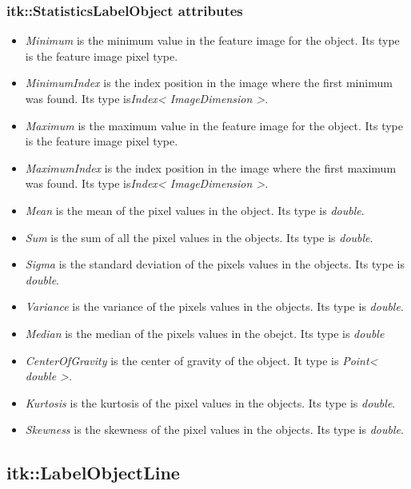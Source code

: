 \documentclass{InsightArticle}
\begin{document}
\subsubsection{itk::StatisticsLabelObject attributes}

\begin{itemize}
  \item {\em Minimum} is the minimum value in the feature image for the object. Its type is
the feature image pixel type.
  \item {\em MinimumIndex} is the index position in the image where the first minimum was
found. Its type is{\em Index< ImageDimension >}.
  \item {\em Maximum} is the maximum value in the feature image for the object. Its type is
the feature image pixel type.
  \item {\em MaximumIndex} is the index position in the image where the first maximum was
found. Its type is{\em Index< ImageDimension >}.
  \item {\em Mean} is the mean of the pixel values in the object. Its type is {\em double}.
  \item {\em Sum} is the sum of all the pixel values in the objects. Its type is {\em double}.
  \item {\em Sigma} is the standard deviation of the pixels values in the objects. Its type
is {\em double}.
  \item {\em Variance} is the variance of the pixels values in the objects. Its type is
{\em double}.
  \item {\em Median} is the median of the pixels values in the obejct. Its type is
{\em double}
  \item {\em CenterOfGravity} is the center of gravity of the object. It type is
{\em Point< double >}.
  \item {\em Kurtosis} is the kurtosis of the pixel values in the objects. Its type is
{\em double}.
  \item {\em Skewness} is the skewness of the pixel values in the objects. Its type is
{\em double}.
\end{itemize}


\subsection{itk::LabelObjectLine}
\end{document}
